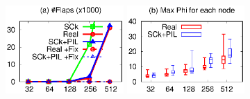 


\def \fgw {1.77in}



\begin{figure}[t]





\centerline{
\hmina
\includegraphics[width=\fgw]{F/accu/eps/flap}
\hminb
\includegraphics[width=\fgw]{F/accu/eps/phi}
}

\vfive %


\end{figure}
